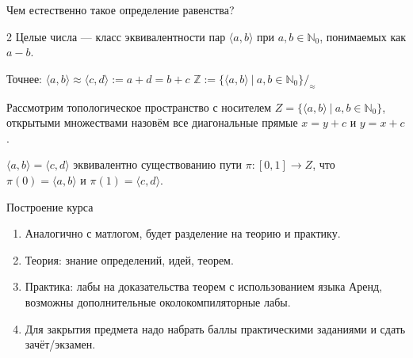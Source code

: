 \documentclass[aspectratio=169]{beamer}
\begin{document}
\begin{frame}{Чем естественно такое определение равенства?}
\begin{multicols}{2}
Целые числа --- класс эквивалентности пар $\langle a,b\rangle$ при $a,b\in\mathbb{N}_0$, понимаемых как $a-b$.

Точнее:
$\langle a,b\rangle\approx\langle c,d\rangle := a+d = b +c$
$\mathbb{Z} := \{\langle a,b\rangle\ |\ a,b\in\mathbb{N}_0\}/_\approx$


Рассмотрим топологическое пространство с носителем $Z = \{\langle a,b\rangle\ |\ a,b\in\mathbb{N}_0\}$,\\
открытыми множествами назовём все диагональные прямые $x = y + c$ и $y = x + c$.\\

\columnbreak



$\langle a,b \rangle = \langle c,d\rangle$ эквивалентно существованию пути
$\pi : [0,1] \rightarrow Z$, что $\pi(0) = \langle a,b\rangle$ и $\pi(1) = \langle c,d\rangle$.


\end{multicols}
\end{frame}

\begin{frame}{Построение курса}
\begin{enumerate}
\item Аналогично с матлогом, будет разделение на теорию и практику.
\item Теория: знание определений, идей, теорем.
\item Практика: лабы на доказательства теорем с использованием языка Аренд, возможны дополнительные околокомпиляторные лабы.
\item Для закрытия предмета надо набрать баллы практическими заданиями и сдать зачёт/экзамен.
\end{enumerate}
\end{frame}
\end{document}
